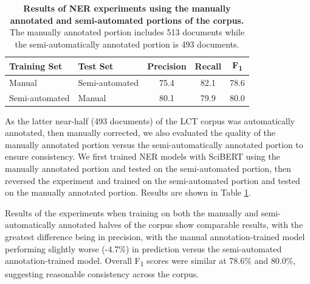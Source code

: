 \documentclass[../main.tex]{subfiles}
\begin{document}
\def\arraystretch{1.2}
\begin{table}[h!]
\centering
\begin{tabular}{l l c c c}
 \toprule
 \textbf{Training Set} & \textbf{Test Set} & \textbf{Precision} & \textbf{Recall} & \textbf{F\textsubscript{1}} \\
 \hline
    Manual & Semi-automated & 75.4 & 82.1 & 78.6 \\
    Semi-automated & Manual & 80.1 & 79.9 & 80.0 \\
 \hline
\end{tabular}
\caption{\textbf{Results of NER experiments using the manually annotated and semi-automated portions of the corpus.} The manually annotated portion includes 513 documents while the semi-automatically annotated portion is 493 documents.}
\label{aim1_tbl_manual_semiauto}
\end{table}

As the latter near-half (493 documents) of the LCT corpus was automatically annotated, then manually corrected, we also evaluated the quality of the manually annotated portion versus the semi-automatically annotated portion to ensure consistency. We first trained NER models with SciBERT using the manually annotated portion and tested on the semi-automated portion, then reversed the experiment and trained on the semi-automated portion and tested on the manually annotated portion. Results are shown in Table \ref{aim1_tbl_manual_semiauto}.

Results of the experiments when training on both the manually and semi-automatically annotated halves of the corpus show comparable results, with the greatest difference being in precision, with the manual annotation-trained model performing slightly worse (-4.7\%) in prediction versus the semi-automated annotation-trained model. Overall F\textsubscript{1} scores were similar at 78.6\% and 80.0\%, suggesting reasonable consistency across the corpus.
\end{document}
